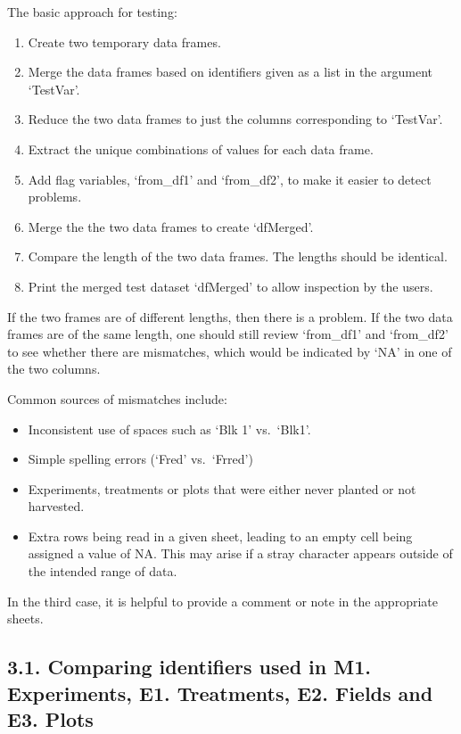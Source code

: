 \documentclass[
]{article}
\providecommand{\tightlist}{%
  \setlength{\itemsep}{0pt}\setlength{\parskip}{0pt}}
\begin{document}
The basic approach for testing:

\begin{enumerate}
\def\labelenumi{\arabic{enumi}.}
\tightlist
\item
  Create two temporary data frames.
\item
  Merge the data frames based on identifiers given as a list in the
  argument `TestVar'.
\item
  Reduce the two data frames to just the columns corresponding to
  `TestVar'.
\item
  Extract the unique combinations of values for each data frame.
\item
  Add flag variables, `from\_df1' and `from\_df2', to make it easier to
  detect problems.
\item
  Merge the the two data frames to create `dfMerged'.
\item
  Compare the length of the two data frames. The lengths should be
  identical.
\item
  Print the merged test dataset `dfMerged' to allow inspection by the
  users.
\end{enumerate}

If the two frames are of different lengths, then there is a problem. If
the two data frames are of the same length, one should still review
`from\_df1' and `from\_df2' to see whether there are mismatches, which
would be indicated by `NA' in one of the two columns.

Common sources of mismatches include:

\begin{itemize}
\tightlist
\item
  Inconsistent use of spaces such as `Blk 1' vs.~`Blk1'.
\item
  Simple spelling errors (`Fred' vs.~`Frred')
\item
  Experiments, treatments or plots that were either never planted or not
  harvested.
\item
  Extra rows being read in a given sheet, leading to an empty cell being
  assigned a value of NA. This may arise if a stray character appears
  outside of the intended range of data.
\end{itemize}

In the third case, it is helpful to provide a comment or note in the
appropriate sheets.

\newpage

\subsection{3.1. Comparing identifiers used in M1. Experiments, E1.
Treatments, E2. Fields and E3.
Plots}\label{comparing-identifiers-used-in-m1.-experiments-e1.-treatments-e2.-fields-and-e3.-plots}
\end{document}
